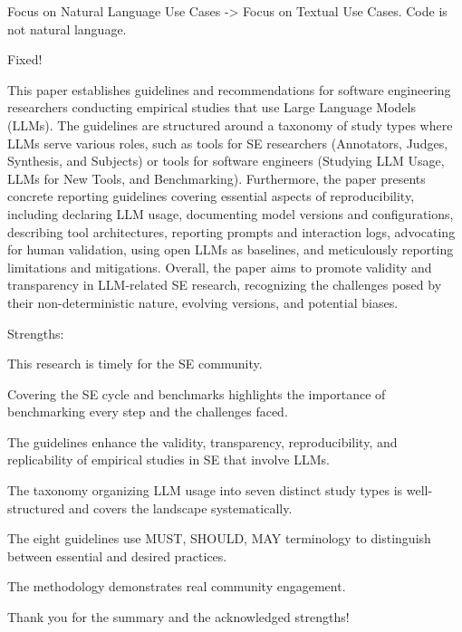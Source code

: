 \documentclass[12pt,english]{reviewresponse}
\begin{document}
\begin{revcomment}
Focus on Natural Language Use Cases -> Focus on Textual Use Cases. Code is not natural language.
\end{revcomment}
\begin{revresponse}
Fixed!
\end{revresponse}

\reviewer
\begin{generalcomment}
This paper establishes guidelines and recommendations for software engineering researchers conducting empirical studies that use Large Language Models (LLMs). The guidelines are structured around a taxonomy of study types where LLMs serve various roles, such as tools for SE researchers (Annotators, Judges, Synthesis, and Subjects) or tools for software engineers (Studying LLM Usage, LLMs for New Tools, and Benchmarking). Furthermore, the paper presents concrete reporting guidelines covering essential aspects of reproducibility, including declaring LLM usage, documenting model versions and configurations, describing tool architectures, reporting prompts and interaction logs, advocating for human validation, using open LLMs as baselines, and meticulously reporting limitations and mitigations. Overall, the paper aims to promote validity and transparency in LLM-related SE research, recognizing the challenges posed by their non-deterministic nature, evolving versions, and
potential biases.

Strengths:

This research is timely for the SE community.

Covering the SE cycle and benchmarks highlights the importance of benchmarking every step and the challenges faced.

The guidelines enhance the validity, transparency, reproducibility, and replicability of empirical studies in SE that involve LLMs.

The taxonomy organizing LLM usage into seven distinct study types is well-structured and covers the landscape systematically.

The eight guidelines use MUST, SHOULD, MAY terminology to distinguish between essential and desired practices.

The methodology demonstrates real community engagement.
\end{generalcomment}
\begin{revresponse}
    Thank you for the summary and the acknowledged strengths!
\end{revresponse}
\end{document}
